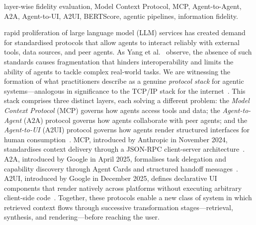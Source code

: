 \documentclass[10pt,journal,compsoc]{IEEEtran}
\begin{document}
\begin{IEEEkeywords}
layer-wise fidelity evaluation, Model Context Protocol, MCP, Agent-to-Agent,
A2A, Agent-to-UI, A2UI, BERTScore, agentic pipelines, information fidelity.
\end{IEEEkeywords}

\vspace{3\baselineskip}

\IEEEpeerreviewmaketitle


 rapid proliferation of large language model (LLM) services
has created demand for standardised protocols that allow agents to interact
reliably with external tools, data sources, and peer agents. As Yang et
al.~\cite{yang2025survey} observe, the absence of such standards causes
fragmentation that hinders interoperability and limits the ability of agents to
tackle complex real-world tasks. We are witnessing the formation of what
practitioners describe as a genuine \emph{protocol stack} for agentic
systems---analogous in significance to the TCP/IP stack for the
internet~\cite{mitra2026stack}. This stack comprises three distinct layers, each
solving a different problem: the \emph{Model Context Protocol} (MCP) governs how
agents access tools and data; the \emph{Agent-to-Agent} (A2A) protocol governs
how agents collaborate with peer agents; and the \emph{Agent-to-UI} (A2UI)
protocol governs how agents render structured interfaces for human
consumption~\cite{mitra2026stack}. MCP, introduced by Anthropic in November
2024, standardises context delivery through a JSON-RPC client-server
architecture~\cite{anthropic2024mcp,ehtesham2025survey}. A2A, introduced by
Google in April 2025, formalises task delegation and capability discovery through
Agent Cards and structured handoff
messages~\cite{ehtesham2025survey,yan2025beyondselftalk,google2025a2a}. A2UI,
introduced by Google in December 2025, defines declarative UI components that
render natively across platforms without executing arbitrary client-side
code~\cite{mitra2026stack,google2025a2ui}. Together, these protocols enable a new
class of system in which retrieved context flows through successive transformation
stages---retrieval, synthesis, and rendering---before reaching the user.
\end{document}
